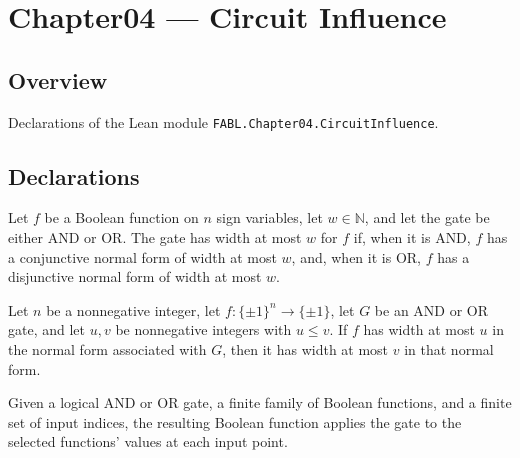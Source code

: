 \chapter{Chapter04 — Circuit Influence}
\section{Overview}

Declarations of the Lean module \texttt{FABL.Chapter04.CircuitInfluence}.

\section{Declarations}

\begin{definition}
\label{FABL.CircuitGate.HasWidthLE}
\leanok
{}
Let $f$ be a Boolean function on $n$ sign variables, let $w\in\mathbb{N}$, and let the
gate be either AND or OR. The gate has width at most $w$ for $f$ if, when it is AND, $f$
has a conjunctive normal form of width at most $w$, and, when it is OR, $f$ has a
disjunctive normal form of width at most $w$.
\end{definition}

\begin{theorem}
\label{FABL.CircuitGate.hasWidthLE_mono}
\leanok
{}
Let $n$ be a nonnegative integer, let $f:\{\pm1\}^n\to\{\pm1\}$, let $G$ be an AND or OR
gate, and let $u,v$ be nonnegative integers with $u\le v$. If $f$ has width at most $u$
in the normal form associated with $G$, then it has width at most $v$ in that normal
form.
\end{theorem}

\begin{definition}
\label{FABL.CircuitGate.evalFinsetFunction}
\leanok
{}
Given a logical AND or OR gate, a finite family of Boolean functions, and a finite set
of input indices, the resulting Boolean function applies the gate to the selected
functions’ values at each input point.
\end{definition}

